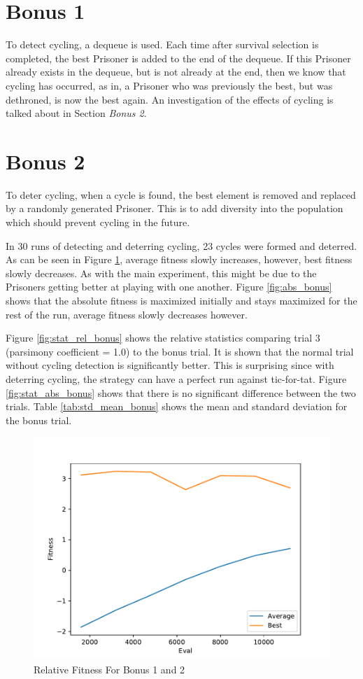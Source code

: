 \documentclass[times]{article}
\begin{document}
	\section{Bonus 1}
	To detect cycling, a dequeue is used. Each time after survival selection is completed, the best Prisoner is added to the end of the dequeue. If this Prisoner already exists in the dequeue, but is not already at the end, then we know that cycling has occurred, as in, a Prisoner who was previously the best, but was dethroned, is now the best again. An investigation of the effects of cycling is talked about in Section \textit{Bonus 2}.

	\section{Bonus 2}
	To deter cycling, when a cycle is found, the best element is removed and replaced by a randomly generated Prisoner. This is to add diversity into the population which should prevent cycling in the future.

	In 30 runs of detecting and deterring cycling, 23 cycles were formed and deterred. As can be seen in Figure \ref{fig:rel_bonus}, average fitness slowly increases, however, best fitness slowly decreases. As with the main experiment, this might be due to the Prisoners getting better at playing with one another. Figure \ref{fig:abs_bonus} shows that the absolute fitness is maximized initially and stays maximized for the rest of the run, average fitness slowly decreases however.

	Figure \ref{fig:stat_rel_bonus} shows the relative statistics comparing trial 3 (parsimony coefficient = 1.0) to the bonus trial. It is shown that the normal trial without cycling detection is significantly better. This is surprising since with deterring cycling, the strategy can have a perfect run against tic-for-tat. Figure \ref{fig:stat_abs_bonus} shows that there is no significant difference between the two trials. Table \ref{tab:std_mean_bonus} shows the mean and standard deviation for the bonus trial.

	\begin{figure}
		\caption{Relative Fitness For Bonus 1 and 2}
		\label{fig:rel_bonus}
		\includegraphics[width=\textwidth]{../graph/graphs/7.pdf}
	\end{figure}
\end{document}
